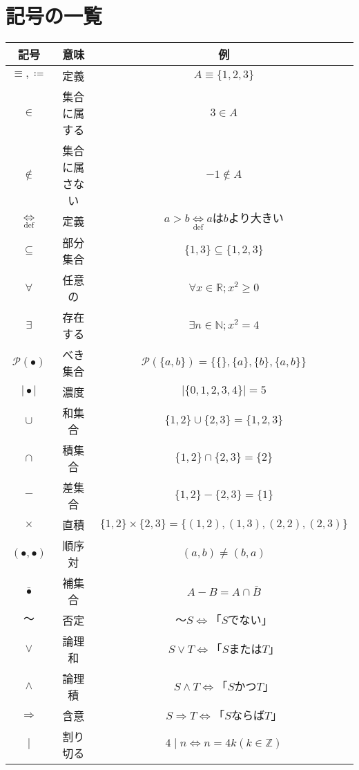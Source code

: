 \documentclass[a4paper,12pt]{ltjsarticle}
\begin{document}
\section{記号の一覧}
\begin{table}[H]
    \centering
    \begin{tabular}{|c|c|c|}
        \hline
        記号 & 意味 & 例 \\
        \hline
        $\equiv, \coloneqq$ & 定義 & $A \equiv \{1, 2, 3\}$ \\
        \hline
        $\in$ & 集合に属する & $3 \in A$ \\
        \hline
        $\notin$ & 集合に属さない & $-1 \notin A$ \\
        \hline
        $\underset{\text{def}}{\Longleftrightarrow}$ & 定義 & $a > b \underset{\text{def}}{\Longleftrightarrow} aはbより大きい$ \\
        \hline
        $\subseteq$ & 部分集合 & $\{ 1, 3 \} \subseteq \{ 1, 2, 3 \}$ \\
        \hline
        $\forall$ & 任意の & $\forall x \in \mathbb{R} ; x^2 \geq 0$ \\
        \hline
        $\exists$ & 存在する & $\exists n \in \mathbb{N} ; x^2 = 4$ \\
        \hline
        $\mathcal{P}(\bullet)$ & べき集合 & $\mathcal{P}(\{ a, b \}) = \{ \{ \}, \{ a \}, \{ b \}, \{ a, b \} \}$ \\
        \hline
        $\mid \bullet \mid$ & 濃度 & $\mid \{ 0, 1, 2, 3, 4 \} \mid = 5$ \\
        \hline
        $\cup$ & 和集合 & $\{ 1, 2 \} \cup \{ 2, 3 \} = \{ 1, 2, 3 \}$ \\
        \hline
        $\cap$ & 積集合 & $\{ 1, 2 \} \cap \{ 2, 3 \} = \{ 2 \}$ \\
        \hline
        $-$ & 差集合 & $\{ 1, 2 \} - \{ 2, 3 \} = \{ 1 \}$ \\
        \hline
        $\times$ & 直積 & $\{ 1, 2 \} \times \{ 2, 3 \} = \{ (1,2), (1,3), (2,2), (2,3) \}$ \\
        \hline
        $(\bullet, \bullet)$ & 順序対 & $(a,b) \neq (b,a)$ \\
        \hline
        $\bar{\bullet}$ & 補集合 & $A - B = A \cap \bar{B}$ \\
        \hline
        $〜$ & 否定 & $〜S \Leftrightarrow 「Sでない」$ \\
        \hline
        $\lor$ & 論理和 & $S \lor T \Leftrightarrow 「SまたはT」$ \\
        \hline
        $\land$ & 論理積 & $S \land T \Leftrightarrow 「SかつT」$ \\
        \hline
        $\Rightarrow$ & 含意 & $S \Rightarrow T \Leftrightarrow 「SならばT」$ \\
        \hline
        $\mid$ & 割り切る & $4 \mid n \Leftrightarrow n = 4k(k \in \mathbb{Z})$ \\
        \hline
    \end{tabular}
\end{table}
\end{document}
